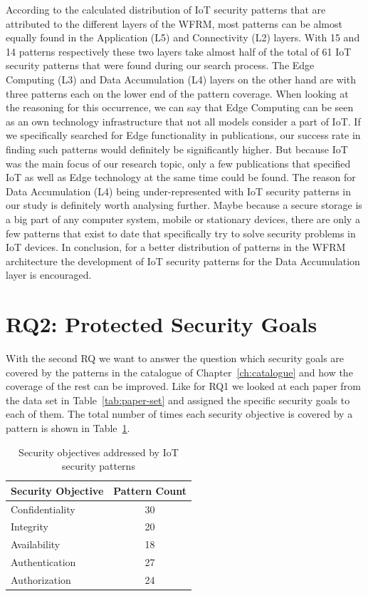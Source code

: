 According to the calculated distribution of IoT security patterns that are attributed to the different layers of the WFRM, most patterns can be almost equally found in the Application (L5) and Connectivity (L2) layers. With 15 and 14 patterns respectively these two layers take almost half of the total of 61 IoT security patterns that were found during our search process. The Edge Computing (L3) and Data Accumulation (L4) layers on the other hand are with three patterns each on the lower end of the pattern coverage. When looking at the reasoning for this occurrence, we can say that Edge Computing can be seen as an own technology infrastructure that not all models consider a part of IoT. If we specifically searched for Edge functionality in publications, our success rate in finding such patterns would definitely be significantly higher. But because IoT was the main focus of our research topic, only a few publications that specified IoT as well as Edge technology at the same time could be found. The reason for Data Accumulation (L4) being under-represented with IoT security patterns in our study is definitely worth analysing further. Maybe because a secure storage is a big part of any computer system, mobile or stationary devices, there are only a few patterns that exist to date that specifically try to solve security problems in IoT devices. In conclusion, for a better distribution of patterns in the WFRM architecture the development of IoT security patterns for the Data Accumulation layer is encouraged.
 

\section{RQ2: Protected Security Goals}\label{sec:rq2}
With the second RQ we want to answer the question which security goals are covered by the patterns in the catalogue of Chapter~\ref{ch:catalogue} and how the coverage of the rest can be improved. Like for RQ1 we looked at each paper from the data set in Table~\ref{tab:paper-set} and assigned the specific security goals to each of them. The total number of times each security objective is covered by a pattern is shown in Table~\ref{tab:rq2}.

\begin{table}[ht]
	\centering
	\caption{Security objectives addressed by IoT security patterns}
	\label{tab:rq2}
	\begin{tabular}{l|c}
		\hline
		\textbf{Security Objective} & \textbf{Pattern Count} \\
		\hline
		Confidentiality     & 30    \\
		Integrity           & 20    \\
		Availability        & 18    \\
		Authentication      & 27    \\
		Authorization       & 24    \\
		\hline
	\end{tabular}
\end{table}

